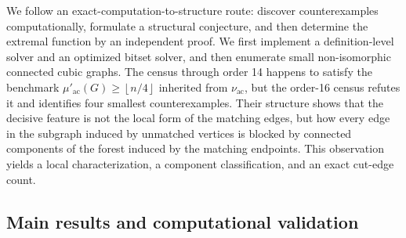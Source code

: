 \documentclass[smallextended,natbib,nospthms]{svjour3}
\theoremstyle{definition}
\theoremstyle{remark}
\newcommand{\acnum}{\mu'_{\mathrm{ac}}}
\newcommand{\maxacnum}{\nu_{\mathrm{ac}}}
\newcommand{\floor}[1]{\left\lfloor #1\right\rfloor}
\begin{document}
We follow an exact-computation-to-structure route: discover counterexamples
computationally, formulate a structural conjecture, and then determine the
extremal function by an independent proof. We first implement a
definition-level solver and an optimized bitset solver, and then enumerate
small non-isomorphic connected cubic graphs. The census through order 14
happens to satisfy the benchmark $\acnum(G)\geq\floor{n/4}$ inherited from
$\maxacnum$, but the
order-16 census refutes it and identifies four smallest counterexamples.
Their structure shows that the decisive feature is not the local form of the
matching edges, but how every edge in the subgraph induced by unmatched
vertices is blocked by connected components of the forest induced by the
matching endpoints. This observation yields a local characterization, a
component classification, and an exact cut-edge count.

\subsection{Main results and computational validation}
\end{document}
